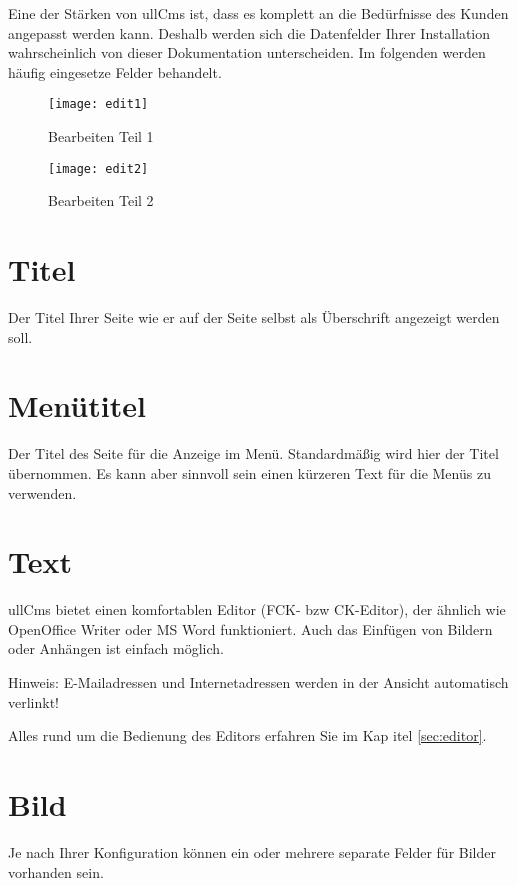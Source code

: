 \documentclass[article, a4paper, oneside, 11pt]{memoir}
\begin{document}
Eine der Stärken von ullCms ist, dass es komplett an die Bedürfnisse des Kunden angepasst werden kann.
Deshalb werden sich die Datenfelder Ihrer Installation wahrscheinlich von dieser Dokumentation unterscheiden. Im folgenden werden häufig eingesetze Felder behandelt.

\begin{figure}[htp]
\centering
\texttt{[image: edit1]}
\caption{Bearbeiten Teil 1}
\label{fig:edit1}
\end{figure}

\begin{figure}[htp]
\centering
\texttt{[image: edit2]}
\caption{Bearbeiten Teil 2}
\label{fig:edit2}
\end{figure}

\section{Titel}

Der Titel Ihrer Seite wie er auf der Seite selbst als Überschrift angezeigt werden soll.

\section{Menütitel}

Der Titel des Seite für die Anzeige im Menü. Standardmäßig wird hier der Titel übernommen. Es kann aber sinnvoll sein einen kürzeren Text für die Menüs zu verwenden.

\section{Text}

ullCms bietet einen komfortablen
Editor (FCK- bzw CK-Editor), der ähnlich wie OpenOffice Writer oder MS Word funktioniert.
Auch das Einfügen von Bildern oder Anhängen ist einfach möglich. 

Hinweis: E-Mailadressen und Internetadressen werden in der Ansicht automatisch verlinkt!

Alles rund um die Bedienung des Editors erfahren Sie im Kap itel \vref{sec:editor}.

\section{Bild}

Je nach Ihrer Konfiguration können ein oder mehrere separate Felder für Bilder vorhanden sein.
\end{document}
